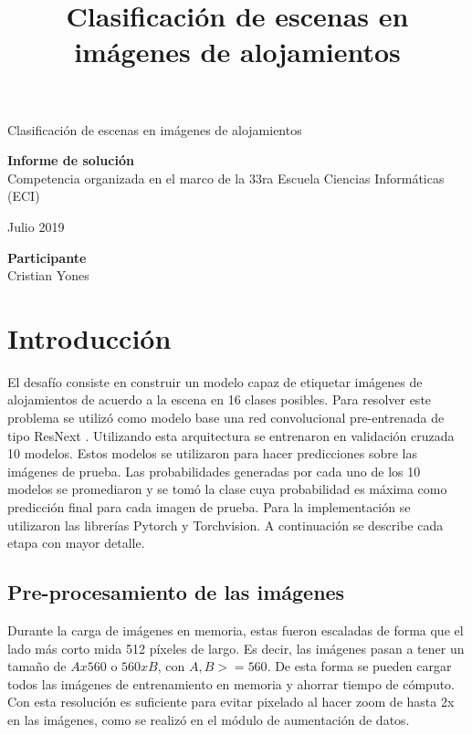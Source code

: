 \documentclass[a4article]{article}
\title{Clasificación de escenas en imágenes de alojamientos}
\begin{document}
\renewcommand{\tablename}{Tabla}

\thispagestyle{empty}

\begin{center}
	{\LARGE Clasificación de escenas en imágenes de alojamientos}

	\vspace{16em}

	\textbf{Informe de solución}\\
	Competencia organizada en el marco de la 33ra Escuela Ciencias Informáticas (ECI)

	\vspace{8em}

	Julio 2019

	\vspace{24em}

	\textbf{Participante} \\
	Cristian Yones
	\vspace{24em}
\end{center}

\newpage

\section{Introducción}
El desafío consiste en construir un modelo capaz de etiquetar imágenes de alojamientos de acuerdo a la escena en 16
clases posibles. Para resolver este problema se utilizó como modelo base una red convolucional pre-entrenada de tipo
ResNext \citep{xie2017aggregated}. Utilizando esta arquitectura se entrenaron en validación cruzada 10 modelos. Estos
modelos se utilizaron para hacer predicciones sobre las imágenes de prueba. Las probabilidades generadas por cada uno de
los 10 modelos se promediaron y se tomó la clase cuya probabilidad es máxima como predicción final para cada imagen de
prueba. Para la implementación se utilizaron las librerías Pytorch y Torchvision. A continuación se describe cada etapa
con mayor detalle.

\subsection{Pre-procesamiento de las imágenes}
Durante la carga de imágenes en memoria, estas fueron escaladas de forma que el lado más corto mida 512 píxeles de
largo. Es decir, las imágenes pasan a tener un tamaño de $Ax560$ o $560xB$, con $A, B >= 560$. De esta forma se pueden
cargar todos las imágenes de entrenamiento en memoria y ahorrar tiempo de cómputo. Con esta resolución es suficiente
para evitar pixelado al hacer zoom de hasta 2x en las imágenes, como se realizó en el módulo de aumentación de datos.
\end{document}
